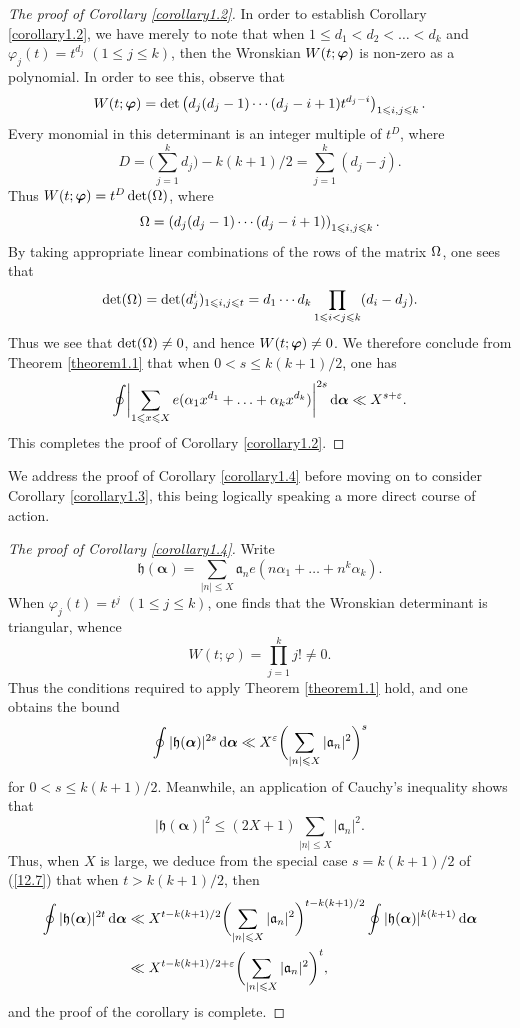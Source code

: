 \documentclass[12pt,reqno]{amsart}
\theoremstyle{definition}
\theoremstyle{remark}
\numberwithin{equation}{section}
\def\gra{{\mathfrak a}}\def\grA{{\mathfrak A}}\def\bfgra{{\boldsymbol \gra}}
\def\grh{{\mathfrak h}}\def\grH{{\mathfrak H}}
\def\alp{{\alpha}} \def\bfalp{{\boldsymbol \alpha}}
\def\eps{\varepsilon}
\def\le{\leqslant} \def\ge{\geqslant} \def\pleq{\preccurlyeq} \def\ple{\prec}
\def\d{{\,{\rm d}}}
\begin{document}
\begin{proof}[The proof of Corollary \ref{corollary1.2}] In order to establish Corollary 
\ref{corollary1.2}, we have merely to note that when $1\le d_1<d_2<\ldots <d_k$ and 
$\varphi_j(t)=t^{d_j}$ $(1\le j\le k)$, then the Wronskian $W(t;{\boldsymbol \varphi})$ is non-zero as 
a polynomial. In order to see this, observe that
$$W(t;\bfvarphi)=\det\left(d_j(d_j-1)\cdots (d_j-i+1)t^{d_j-i}\right)_{1\le i,j\le k}.$$
Every monomial in this determinant is an integer multiple of $t^D$, where
$$D=\biggl( \sum_{j=1}^kd_j\biggr) -k(k+1)/2=\sum_{j=1}^k(d_j-j).$$
Thus $W(t;{\boldsymbol \varphi})=t^D\det({\Omega})$, where
$$\Ome=\left( d_j(d_j-1)\cdots (d_j-i+1)\right)_{1\le i,j\le k}.$$
By taking appropriate linear combinations of the rows of the matrix ${\Omega}$, one sees that
$$\det(\Ome)=\det(d_j^i)_{1\le i,j\le t}=d_1\cdots d_k\prod_{1\le i<j\le k}(d_i-d_j).$$
Thus we see that $\det({\Omega})\ne 0$, and hence $W(t;{\boldsymbol \varphi})\ne 0$. We therefore 
conclude from Theorem \ref{theorem1.1} that when $0<s\le k(k+1)/2$, one has
$$\oint \biggl| \sum_{1\le x\le X}e(\alp_1x^{d_1}+\ldots +\alp_kx^{d_k})\biggr|^{2s}
\d\bfalp \ll X^{s+\eps}.$$
This completes the proof of Corollary \ref{corollary1.2}.
\end{proof}

We address the proof of Corollary \ref{corollary1.4} before moving on to consider Corollary 
\ref{corollary1.3}, this being logically speaking a more direct course of action.

\begin{proof}[The proof of Corollary \ref{corollary1.4}] Write
$$\grh(\bfalp)=\sum_{|n|\le X}\gra_ne(n\alp_1+\ldots +n^k\alp_k).$$
When $\varphi_j(t)=t^j$ $(1\le j\le k)$, one finds that the Wronskian determinant is 
triangular, whence
$$W(t;\varphi)=\prod_{j=1}^kj!\ne 0.$$
Thus the conditions required to apply Theorem \ref{theorem1.1} hold, and one obtains the 
bound
\begin{equation}\label{12.7}
\oint |\grh(\bfalp)|^{2s}\d\bfalp \ll X^\eps \biggl( \sum_{|n|\le X}|\gra_n|^2\biggr)^s
\end{equation}
for $0<s\le k(k+1)/2$. Meanwhile, an application of Cauchy's inequality shows that
$$|\grh(\bfalp)|^2\le (2X+1)\sum_{|n|\le X}|\gra_n|^2.$$
Thus, when $X$ is large, we deduce from the special case $s=k(k+1)/2$ of (\ref{12.7}) 
that when $t>k(k+1)/2$, then
\begin{align*}
\oint |\grh(\bfalp)|^{2t}\d\bfalp &\ll X^{t-k(k+1)/2}\biggl( \sum_{|n|\le X}
|\gra_n|^2\biggr)^{t-k(k+1)/2}\oint |\grh(\bfalp)|^{k(k+1)}\d\bfalp \\
&\ll X^{t-k(k+1)/2+\eps}\biggl( \sum_{|n|\le X}|\gra_n|^2\biggr)^t,
\end{align*}
and the proof of the corollary is complete.
\end{proof}
\end{document}
